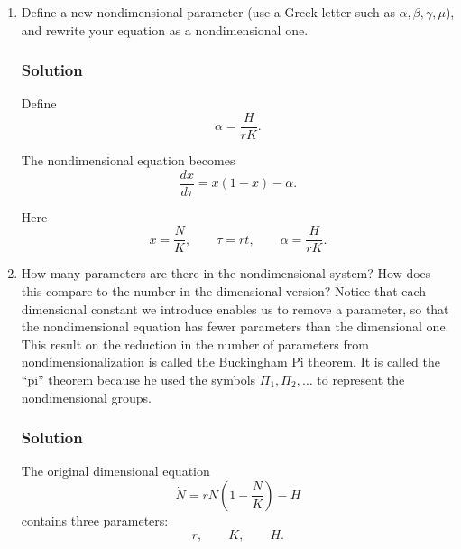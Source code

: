 \documentclass[12pt]{amsart}
\theoremstyle{conjecture}
\theoremstyle{definition}
\theoremstyle{question}
\theoremstyle{theorem}
\begin{document}
\begin{enumerate}[label=(\alph*)]
        The differential equation becomes
        \[
            \frac{dx}{d\tau}
            =
            x(1-x)
            -
            \frac{H}{rK}.
        \]

        \item
        Define a new nondimensional parameter (use a Greek letter such as
        \(\alpha,\beta,\gamma,\mu\)), and rewrite your equation as a
        nondimensional one.

        \subsubsection*{Solution}

        Define
        \[
            \boxed{
                \alpha=\frac{H}{rK}
            }.
        \]

        The nondimensional equation becomes
        \[
            \boxed{
                \frac{dx}{d\tau}
                =
                x(1-x)-\alpha.
            }
        \]

        Here
        \[
            x=\frac{N}{K},
            \qquad
            \tau=rt,
            \qquad
            \alpha=\frac{H}{rK}.
        \]

        \item
        How many parameters are there in the nondimensional system? How does
        this compare to the number in the dimensional version? Notice that
        each dimensional constant we introduce enables us to remove a
        parameter, so that the nondimensional equation has fewer parameters
        than the dimensional one. This result on the reduction in the number
        of parameters from nondimensionalization is called the Buckingham Pi
        theorem. It is called the ``pi'' theorem because he used the symbols
        \(\Pi_1,\Pi_2,\ldots\) to represent the nondimensional groups.

        \subsubsection*{Solution}

        The original dimensional equation
        \[
            \dot N
            =
            rN\left(1-\frac{N}{K}\right)-H
        \]
        contains three parameters:
        \[
            r,\qquad K,\qquad H.
        \]


\end{enumerate}
\end{document}
